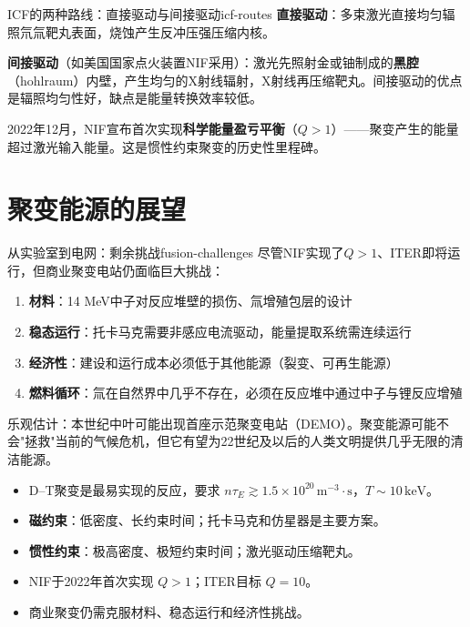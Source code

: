 \documentclass[12pt,a4paper,openany,oneside]{book}
\newcommand{\difficulty}[1]{\marginnote{\textcolor{red}{\textbf{[#1]}}}}
\begin{document}
\begin{insight}{ICF的两种路线：直接驱动与间接驱动}{icf-routes}
\textbf{直接驱动}：多束激光直接均匀辐照氘氚靶丸表面，烧蚀产生反冲压强压缩内核。

\textbf{间接驱动}（如美国国家点火装置NIF采用）：激光先照射金或铀制成的\textbf{黑腔}（hohlraum）内壁，产生均匀的X射线辐射，X射线再压缩靶丸。间接驱动的优点是辐照均匀性好，缺点是能量转换效率较低。

2022年12月，NIF宣布首次实现\textbf{科学能量盈亏平衡}（$Q>1$）——聚变产生的能量超过激光输入能量。这是惯性约束聚变的历史性里程碑。
\end{insight}

\section{聚变能源的展望}\difficulty{提高}

\begin{insight}{从实验室到电网：剩余挑战}{fusion-challenges}
尽管NIF实现了$Q>1$、ITER即将运行，但商业聚变电站仍面临巨大挑战：
\begin{enumerate}
\item \textbf{材料}：14 MeV中子对反应堆壁的损伤、氚增殖包层的设计
\item \textbf{稳态运行}：托卡马克需要非感应电流驱动，能量提取系统需连续运行
\item \textbf{经济性}：建设和运行成本必须低于其他能源（裂变、可再生能源）
\item \textbf{燃料循环}：氚在自然界中几乎不存在，必须在反应堆中通过中子与锂反应增殖
\end{enumerate}

乐观估计：本世纪中叶可能出现首座示范聚变电站（DEMO）。聚变能源可能不会"拯救"当前的气候危机，但它有望为22世纪及以后的人类文明提供几乎无限的清洁能源。
\end{insight}

\begin{chapterreview}
\begin{itemize}
\item D--T聚变是最易实现的反应，要求 $n\tau_E \gtrsim 1.5\times 10^{20}\,\mathrm{m}^{-3}\cdot\mathrm{s}$，$T\sim 10\,\mathrm{keV}$。
\item \textbf{磁约束}：低密度、长约束时间；托卡马克和仿星器是主要方案。
\item \textbf{惯性约束}：极高密度、极短约束时间；激光驱动压缩靶丸。
\item NIF于2022年首次实现 $Q>1$；ITER目标 $Q=10$。
\item 商业聚变仍需克服材料、稳态运行和经济性挑战。
\end{itemize}
\end{chapterreview}
\end{document}
